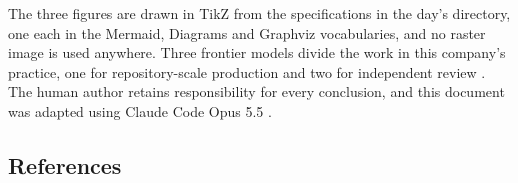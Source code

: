 The three figures are drawn in TikZ from the specifications in the day's
 directory, one each in the Mermaid, Diagrams and Graphviz
vocabularies, and no raster image is used anywhere. Three frontier models divide
the work in this company's practice, one for repository-scale production and two
for independent review \cite{tripartisan2026}. The human author retains
responsibility for every conclusion, and this document was adapted using Claude
Code Opus 5.5 \cite{repo2026}.

\subsection{References}

\begin{apprefs}
\nocite{*}


\end{apprefs}

